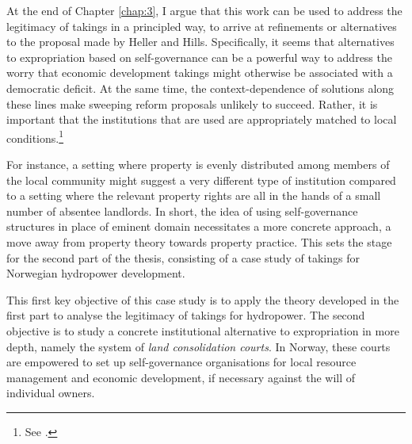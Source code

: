 At the end of Chapter \ref{chap:3}, I argue that this work can be used to address the legitimacy of takings in a principled way, to arrive at refinements or alternatives to the proposal made by Heller and Hills. Specifically, it seems that alternatives to expropriation based on self-governance can be a powerful way to address the worry that economic development takings might otherwise be associated with a democratic deficit. At the same time, the context-dependence of solutions along these lines make sweeping reform proposals unlikely to succeed. Rather, it is important that the institutions that are used are appropriately matched to local conditions.\footnote{See \cite[92]{ostrom90}.}

For instance, a setting where property is evenly distributed among members of the local community might suggest a very different type of institution compared to a setting where the relevant property rights are all in the hands of a small number of absentee landlords. In short, the idea of using self-governance structures in place of eminent domain necessitates a more concrete approach, a move away from property theory towards property practice. This sets the stage for the second part of the thesis, consisting of a case study of takings for Norwegian hydropower development. 

This first key objective of this case study is to apply the theory developed in the first part to analyse the legitimacy of takings for hydropower. The second objective is to study a concrete institutional alternative to expropriation in more depth, namely the system of {\it land consolidation courts}. In Norway, these courts are empowered to set up self-governance organisations for local resource management and economic development, if necessary against the will of individual owners.



